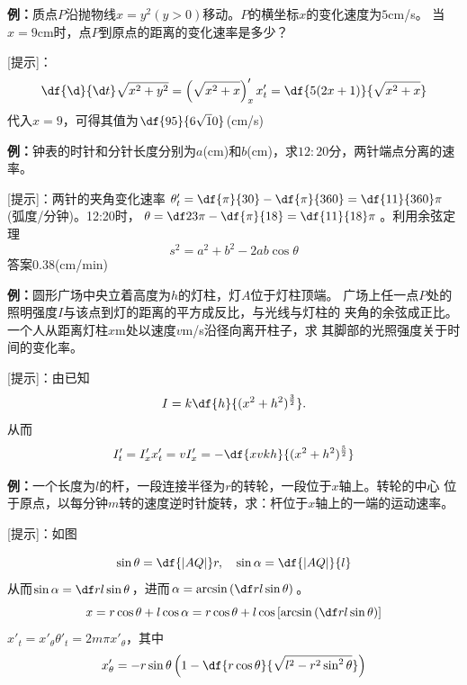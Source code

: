 {\bf 例：}质点$P$沿抛物线$x=y^2(y>0)$移动。$P$的横坐标$x$的变化速度为$5$cm/s。
当$x=9$cm时，点$P$到原点的距离的变化速率是多少？

[提示]：
$$\df{\d}{\d t}\sqrt{x^2+y^2}=\left(\sqrt{x^2+x}\right)'_xx'_t
=\df{5(2x+1)}{\sqrt{x^2+x}}$$
代入$x=9$，可得其值为$\df{95}{6\sqrt10}$(cm/s)

{\bf 例：}钟表的时针和分针长度分别为$a$(cm)和$b$(cm)，求$12:20$分，两针端点分离的速率。

[提示]：两针的夹角变化速率$\theta'_t=\df{\pi}{30}-\df{\pi}{360}
=\df{11}{360}\pi$(弧度/分钟)。12:20时，$\theta=\df23\pi-\df{\pi}{18}
=\df{11}{18}\pi$。利用余弦定理
$$s^2=a^2+b^2-2ab\cos\theta$$
答案$0.38$(cm/min)

{\bf 例：}圆形广场中央立着高度为$h$的灯柱，灯$A$位于灯柱顶端。
广场上任一点$P$处的照明强度$I$与该点到灯的距离的平方成反比，与光线与灯柱的
夹角的余弦成正比。一个人从距离灯柱$x$m处以速度$v$m/s沿径向离开柱子，求
其脚部的光照强度关于时间的变化率。

[提示]：由已知
$$I=k\df{h}{(x^2+h^2)^{\frac32}}.$$
从而
$$I'_t=I'_xx'_t=vI'_x=-\df{xvkh}{(x^2+h^2)^{\frac52}}$$

{\bf 例：}一个长度为$l$的杆，一段连接半径为$r$的转轮，一段位于$x$轴上。转轮的中心
位于原点，以每分钟$m$转的速度逆时针旋转，求：杆位于$x$轴上的一端的运动速率。

[提示]：如图
\begin{center}
\end{center}
$$\sin\theta=\df{|AQ|}r,\quad \sin\alpha=\df{|AQ|}{l}$$
从而$\sin\alpha=\df rl\sin\theta$，进而$\alpha=\arcsin\left(
\df rl\sin\theta\right)$。
$$x=r\cos\theta+l\cos\alpha=r\cos\theta+l\cos
\left[\arcsin\left(\df rl\sin\theta\right)\right]$$
$x'_t=x'_{\theta}\theta'_t=2m\pi x'_{\theta}$，其中
$$x'_{\theta}
=-r\sin\theta\left(1-\df{r\cos\theta}{\sqrt{l^2-r^2\sin^2\theta}}\right)$$

